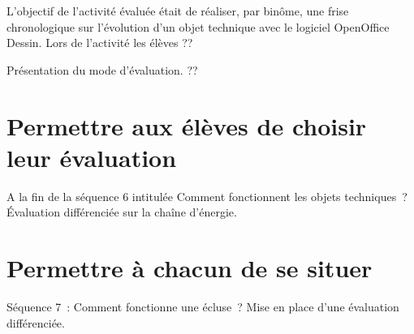 L'objectif de l'activité évaluée était de réaliser, par binôme, une frise chronologique sur l'évolution d'un objet technique avec le logiciel OpenOffice Dessin.
Lors de l'activité les élèves  ??

Présentation du mode d'évaluation. ??

\section{Permettre aux élèves de choisir leur évaluation}

A la fin de la séquence 6 intitulée \og Comment fonctionnent les objets techniques~?\fg
Évaluation différenciée sur la chaîne d'énergie.


\section{Permettre à chacun de se situer }

Séquence 7~: Comment fonctionne une écluse~?
Mise en place d'une évaluation différenciée.



